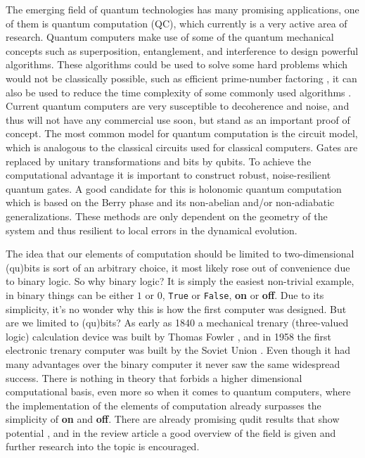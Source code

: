 The emerging field of quantum technologies has many promising applications, one of them is quantum computation (QC), which currently is a very active area of research. Quantum computers make use of some of the quantum mechanical concepts such as superposition, entanglement, and interference to design powerful algorithms. These algorithms could be used to solve some hard problems which would not be classically possible, such as efficient prime-number factoring \cite{shor}, it can also be used to reduce the time complexity of some commonly used algorithms \cite{Grover}. Current quantum computers are very susceptible to decoherence and noise, and thus will not have any commercial use soon, but stand as an important proof of concept. 
The most common model for quantum computation is the circuit model, which is analogous to the classical circuits used for classical computers. Gates are replaced by unitary transformations and bits by qubits. To achieve the computational advantage it is important to construct robust, noise-resilient quantum gates. A good candidate for this is holonomic quantum computation \cite{HQC,NHQC} which is based on the Berry phase \cite{berry} and its non-abelian and/or non-adiabatic generalizations\cite{anandan1,anandan2,zee}. These methods are only dependent on the geometry of the system and thus resilient to local errors in the dynamical evolution.


The idea that our elements of computation should be limited to two-dimensional (qu)bits is sort of an arbitrary choice, it most likely rose out of convenience due to binary logic. So why binary logic? It is simply the easiest non-trivial example, in binary things can be either $1$ or $0$, {\tt True} or {\tt False}, \textbf{on} or \textbf{off}. Due to its simplicity, it's no wonder why this is how the first computer was designed. But are we limited to (qu)bits? As early as 1840 a mechanical trenary (three-valued logic) calculation device was built by Thomas Fowler \cite{tricalc}, and in 1958 the first electronic trenary computer was built by the Soviet Union \cite{setun}. Even though it had many advantages over the binary computer it never saw the same widespread success. There is nothing in theory that forbids a higher dimensional computational basis, even more so when it comes to quantum computers, where the implementation of the elements of computation already surpasses the simplicity of \textbf{on} and \textbf{off}. There are already promising qudit results that show potential \cite{qutrit1,qudit2,qudit3}, and in the review article \cite{qudit} a good overview of the field is given and further research into the topic is encouraged.

